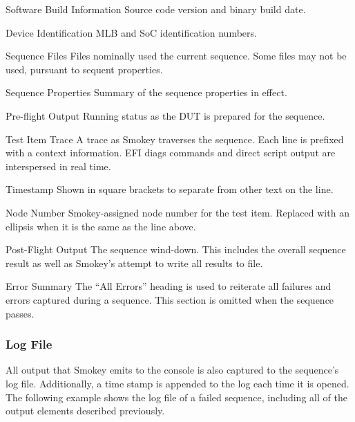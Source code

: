 \begin{LogSection}

\item[Software Build Information] Source code version and binary build date.

\item[Device Identification] MLB and SoC identification numbers.

\item[Sequence Files] Files nominally used the current sequence.  Some files
may not be used, pursuant to sequent properties.

\item[Sequence Properties] Summary of the sequence properties in effect.

\item[Pre-flight Output] Running status as the DUT is prepared for the
sequence.

\item[Test Item Trace] A trace as Smokey traverses the sequence.  Each line is
prefixed with a context information.  EFI diags commands and direct script
output are interspersed in real time.

	\begin{Definition}

	\item[Timestamp] Shown in square brackets to separate from other text
	on the line.

	\item[Node Number] Smokey-assigned node number for the test item.
	Replaced with an ellipsis when it is the same as the line above.

	\end{Definition}

\item[Post-Flight Output] The sequence wind-down.  This includes the overall
sequence result as well as Smokey's attempt to write all results to file.

\item[Error Summary] The ``All Errors'' heading is used to reiterate all
failures and errors captured during a sequence.  This section is omitted when
the sequence passes.

\end{LogSection}

\subsubsection{Log File}

All output that Smokey emits to the console is also captured to the sequence's
log file.  Additionally, a time stamp is appended to the log each time it is
opened.  The following example shows the log file of a failed sequence,
including all of the output elements described previously.

